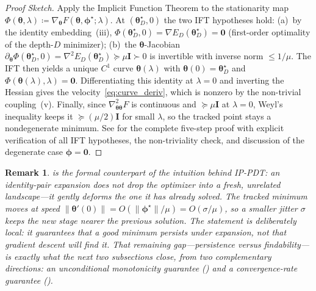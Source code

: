 \documentclass[11pt]{article}
\theoremstyle{plain}
\theoremstyle{plain}
\newtheorem{remark}[theorem]{Remark}
\begin{document}
\begin{proof}[Proof Sketch]
Apply the Implicit Function Theorem to the stationarity map
$\Phi(\bm\theta,\lambda)
\coloneqq\nabla_{\bm\theta}F(\bm\theta,\bm\phi^\star;\lambda)$.
At $(\bm\theta_D^\star,0)$ the two IFT hypotheses hold:
(a)~by the identity embedding~(iii),
$\Phi(\bm\theta_D^\star,0)=\nabla E_D(\bm\theta_D^\star)=\bm 0$
(first-order optimality of the depth-$D$ minimizer);
(b)~the $\bm\theta$-Jacobian
$\partial_{\bm\theta}\Phi(\bm\theta_D^\star,0)
=\nabla^2 E_D(\bm\theta_D^\star)\succeq\mu \mathbf{I}\succ 0$ is invertible
with inverse norm $\le 1/\mu$.  The IFT then yields a unique $C^1$
curve $\bm\theta(\lambda)$ with $\bm\theta(0)=\bm\theta_D^\star$ and
$\Phi(\bm\theta(\lambda),\lambda)=\bm0$.  Differentiating this identity
at $\lambda=0$ and inverting the Hessian gives the
velocity~\eqref{eq:curve_deriv}, which is nonzero by the non-trivial
coupling~(v).  Finally, since $\nabla^2_{\bm\theta\bm\theta}F$ is
continuous and $\succeq\mu\mathbf{I}$ at $\lambda=0$, Weyl's inequality keeps
it $\succeq(\mu/2)\mathbf{I}$ for small $\lambda$, so the tracked point stays
a nondegenerate minimum.
See  for the complete five-step proof
with explicit verification of all IFT hypotheses, the non-triviality
check, and discussion of the degenerate case $\bm\phi=\bm 0$.
\end{proof}

\begin{remark}
 is the formal counterpart of the intuition
behind IP-PDT: an identity-pair expansion does not drop the optimizer
into a fresh, unrelated landscape---it gently \emph{deforms} the one it
has already solved.  The tracked minimum moves at speed
$\|\bm\theta'(0)\|=O(\|\bm\phi^\star\|/\mu)=O(\sigma/\mu)$, so a smaller
jitter $\sigma$ keeps the new stage nearer the previous solution.  The
statement is deliberately local: it guarantees that a good minimum
\emph{persists} under expansion, not that gradient descent will
\emph{find} it.  That remaining gap---persistence versus
findability---is exactly what the next two subsections close, from two
complementary directions: an unconditional monotonicity guarantee
() and a convergence-rate guarantee
().
\end{remark}
\end{document}
